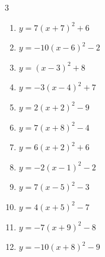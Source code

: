 \begin{multicols}{3}
\begin{enumerate}
  \item $\displaystyle y=7\left( x+7\right)^{2}+6$

        \phantom{$\displaystyle 頂点\left( -7 , 6 \right)$}

  \item $\displaystyle y=-10\left( x-6\right)^{2}-2$

        \phantom{$\displaystyle 頂点\left( 6 , -2 \right)$}

  \item $\displaystyle y=\left( x-3\right)^{2}+8$

        \phantom{$\displaystyle 頂点\left( 3 , 8 \right)$}

  \item $\displaystyle y=-3\left( x-4\right)^{2}+7$

        \phantom{$\displaystyle 頂点\left( 4 , 7 \right)$}

  \item $\displaystyle y=2\left( x+2\right)^{2}-9$

        \phantom{$\displaystyle 頂点\left( -2 , -9 \right)$}

  \item $\displaystyle y=7\left( x+8\right)^{2}-4$

        \phantom{$\displaystyle 頂点\left( -8 , -4 \right)$}

  \item $\displaystyle y=6\left( x+2\right)^{2}+6$

        \phantom{$\displaystyle 頂点\left( -2 , 6 \right)$}

  \item $\displaystyle y=-2\left( x-1\right)^{2}-2$

        \phantom{$\displaystyle 頂点\left( 1 , -2 \right)$}

  \item $\displaystyle y=7\left( x-5\right)^{2}-3$

        \phantom{$\displaystyle 頂点\left( 5 , -3 \right)$}

  \item $\displaystyle y=4\left( x+5\right)^{2}-7$

        \phantom{$\displaystyle 頂点\left( -5 , -7 \right)$}

  \item $\displaystyle y=-7\left( x+9\right)^{2}-8$

        \phantom{$\displaystyle 頂点\left( -9 , -8 \right)$}

  \item $\displaystyle y=-10\left( x+8\right)^{2}-9$


\end{enumerate}
\end{multicols}

